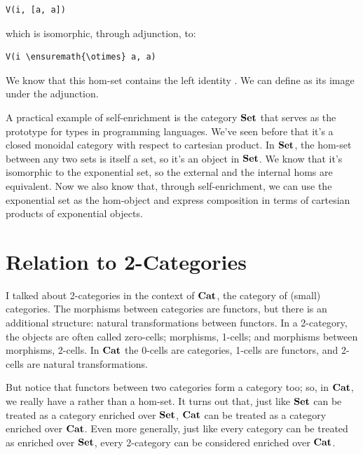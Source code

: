 \begin{Verbatim}[commandchars=\\\{\}]
V(i, [a, a])
\end{Verbatim}
which is isomorphic, through adjunction, to:

\begin{Verbatim}[commandchars=\\\{\}]
V(i \ensuremath{\otimes} a, a)
\end{Verbatim}
We know that this hom-set contains the left identity . We can
define  as its image under the adjunction.

A practical example of self-enrichment is the category $\mathbf{Set}$ that
serves as the prototype for types in programming languages. We've seen
before that it's a closed monoidal category with respect to cartesian
product. In $\mathbf{Set}$, the hom-set between any two sets is itself a
set, so it's an object in $\mathbf{Set}$. We know that it's isomorphic to
the exponential set, so the external and the internal homs are
equivalent. Now we also know that, through self-enrichment, we can use
the exponential set as the hom-object and express composition in terms
of cartesian products of exponential objects.

\section{Relation to 2-Categories}\label{relation-to-2-categories}

I talked about 2-categories in the context of $\mathbf{Cat}$, the category
of (small) categories. The morphisms between categories are functors,
but there is an additional structure: natural transformations between
functors. In a 2-category, the objects are often called zero-cells;
morphisms, 1-cells; and morphisms between morphisms, 2-cells. In
$\mathbf{Cat}$ the 0-cells are categories, 1-cells are functors, and
2-cells are natural transformations.

But notice that functors between two categories form a category too; so,
in $\mathbf{Cat}$, we really have a  rather than a
hom-set. It turns out that, just like $\mathbf{Set}$ can be treated as a
category enriched over $\mathbf{Set}$, $\mathbf{Cat}$ can be treated as a
category enriched over $\mathbf{Cat}$. Even more generally, just like
every category can be treated as enriched over $\mathbf{Set}$, every
2-category can be considered enriched over $\mathbf{Cat}$.